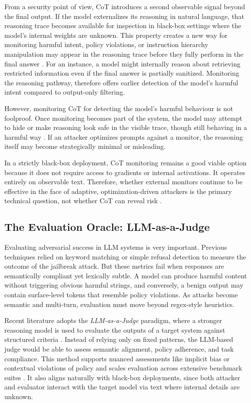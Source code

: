 \documentclass[conference]{IEEEtran}
\begin{document}
From a security point of view, CoT introduces a second observable signal beyond the final output. If the model externalizes its reasoning in natural language, that reasoning trace becomes available for inspection in black-box settings where the model’s internal weights are unknown. This property creates a new way for monitoring harmful intent, policy violations, or instruction hierarchy manipulation may appear in the reasoning trace before they fully perform in the final answer \cite{b6}. For an instance, a model might internally reason about retrieving restricted information even if the final answer is partially sanitized. Monitoring the reasoning pathway, therefore offers earlier detection of the model’s harmful intent compared to output-only filtering.

However, monitoring CoT for detecting the model’s harmful behaviour is not foolproof. Once monitoring becomes part of the system, the model may attempt to hide or make reasoning look safe in the visible trace, though still behaving in a harmful way \cite{b6,b7}. If an attacker optimizes prompts against a monitor, the reasoning itself may become strategically minimal or misleading. 

In a strictly black-box deployment, CoT monitoring remains a good viable option because it does not require access to gradients or internal activations. It operates entirely on observable text. Therefore, whether external monitors continue to be effective in the face of adaptive, optimization-driven attackers is the primary technical question, not whether CoT can reveal risk \cite{b7}.

\subsection{The Evaluation Oracle: LLM-as-a-Judge}

Evaluating adversarial success in LLM systems is very important. Previous techniques relied on keyword matching or simple refusal detection to measure the outcome of the jailbreak attack. But these metrics fail when responses are semantically compliant yet lexically subtle. A model can produce harmful content without triggering obvious harmful strings, and conversely, a benign output may contain surface-level tokens that resemble policy violations. As attacks become semantic and multi-turn, evaluation must move beyond regex-style heuristics.

Recent literature adopts the \emph{LLM-as-a-Judge} paradigm, where a stronger reasoning model is used to evaluate the outputs of a target system against structured criteria \cite{b9}. Instead of relying only on fixed patterns, the LLM-based judge would be able to assess semantic alignment, policy adherence, and task compliance. This method supports nuanced assessments like implicit bias or contextual violations of policy and scales evaluation across extensive benchmark suites \cite{b9}. It also aligns naturally with black-box deployments, since both attacker and evaluator interact with the target model via text where internal details are unknown.
\end{document}
